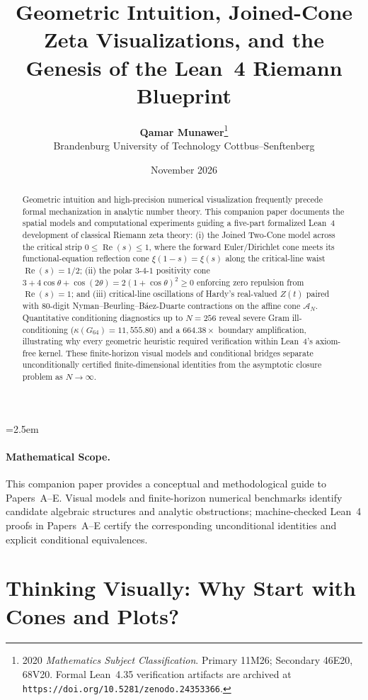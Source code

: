 \documentclass[11pt,a4paper]{article}
\title{\textbf{Geometric Intuition, Joined-Cone Zeta Visualizations, and the Genesis of the Lean~4 Riemann Blueprint}}
\author{\textbf{Qamar Munawer}\thanks{2020 \emph{Mathematics Subject Classification}. Primary 11M26; Secondary 46E20, 68V20. Formal Lean~4.35 verification artifacts are archived at \texttt{https://doi.org/10.5281/zenodo.24353366}.}\\[0.3em]
\small Brandenburg University of Technology Cottbus--Senftenberg}
\date{November 2026}
\begin{document}
\linespread{1.15}\selectfont
\emergencystretch=2.5em

\maketitle

\begin{abstract}
Geometric intuition and high-precision numerical visualization frequently precede formal mechanization in analytic number theory. This companion paper documents the spatial models and computational experiments guiding a five-part formalized Lean~4 development of classical Riemann zeta theory: (i) the Joined Two-Cone model across the critical strip $0 \le \operatorname{Re}(s) \le 1$, where the forward Euler/Dirichlet cone meets its functional-equation reflection cone $\xi(1-s) = \xi(s)$ along the critical-line waist $\operatorname{Re}(s) = 1/2$; (ii) the polar $3$-$4$-$1$ positivity cone $3 + 4\cos\theta + \cos(2\theta) = 2(1+\cos\theta)^2 \ge 0$ enforcing zero repulsion from $\operatorname{Re}(s) = 1$; and (iii) critical-line oscillations of Hardy's real-valued $Z(t)$ paired with $80$-digit Nyman--Beurling--B\'aez-Duarte contractions on the affine cone $\mathcal{A}_N$. Quantitative conditioning diagnostics up to $N = 256$ reveal severe Gram ill-conditioning ($\kappa(G_{64}) = 11{,}555.80$) and a $664.38\times$ boundary amplification, illustrating why every geometric heuristic required verification within Lean~4's axiom-free kernel. These finite-horizon visual models and conditional bridges separate unconditionally certified finite-dimensional identities from the asymptotic closure problem as $N \to \infty$.
\end{abstract}

\paragraph{Mathematical Scope.}
This companion paper provides a conceptual and methodological guide to Papers~A--E. Visual models and finite-horizon numerical benchmarks identify candidate algebraic structures and analytic obstructions; machine-checked Lean~4 proofs in Papers~A--E certify the corresponding unconditional identities and explicit conditional equivalences.

\section{Thinking Visually: Why Start with Cones and Plots?}\label{sec:thinking}
\end{document}
